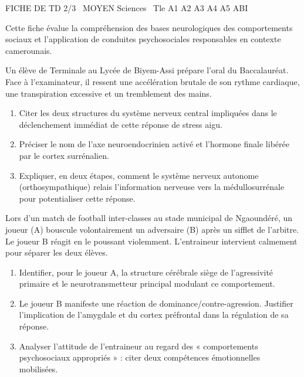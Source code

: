\documentclass[11pt]{article}
\begin{document}
\begin{tcolorbox}[enhanced,colback=popink,colframe=popink,arc=10pt,boxrule=0pt,left=12pt,right=12pt,top=9pt,bottom=9pt]
{\color{white}\popxbold\small FICHE DE TD 2/3 \textbullet\ MOYEN \hfill Sciences \textbullet\ Tle A1 A2 A3 A4 A5 ABI\par}
\end{tcolorbox}
\vspace{4pt}
Cette fiche évalue la compréhension des bases neurologiques des comportements sociaux et l'application de conduites psychosociales responsables en contexte camerounais.

\begin{exercice}
Un élève de Terminale au Lycée de Biyem-Assi prépare l'oral du Baccalauréat. Face à l'examinateur, il ressent une accélération brutale de son rythme cardiaque, une transpiration excessive et un tremblement des mains.
\begin{enumerate}
    \item Citer les deux structures du système nerveux central impliquées dans le déclenchement immédiat de cette réponse de stress aigu.
    \item Préciser le nom de l'axe neuroendocrinien activé et l'hormone finale libérée par le cortex surrénalien.
    \item Expliquer, en deux étapes, comment le système nerveux autonome (orthosympathique) relais l'information nerveuse vers la médullosurrénale pour potentialiser cette réponse.
\end{enumerate}
\end{exercice}

\begin{exercice}
Lors d'un match de football inter-classes au stade municipal de Ngaoundéré, un joueur (A) bouscule volontairement un adversaire (B) après un sifflet de l'arbitre. Le joueur B réagit en le poussant violemment. L'entraineur intervient calmement pour séparer les deux élèves.
\begin{enumerate}
    \item Identifier, pour le joueur A, la structure cérébrale siège de l'agressivité primaire et le neurotransmetteur principal modulant ce comportement.
    \item Le joueur B manifeste une réaction de dominance/contre-agression. Justifier l'implication de l'amygdale et du cortex préfrontal dans la régulation de sa réponse.
    \item Analyser l'attitude de l'entraineur au regard des « comportements psychosociaux appropriés » : citer deux compétences émotionnelles mobilisées.
\end{enumerate}
\end{exercice}
\end{document}
